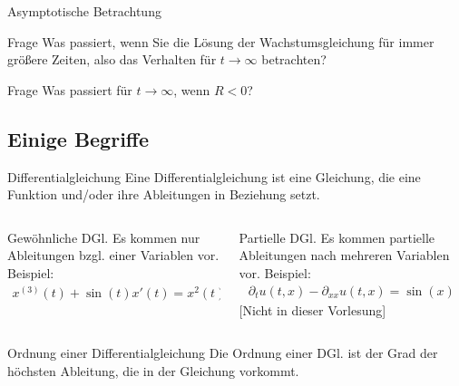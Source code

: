 \documentclass[notheorems,hidelinks,aspectratio=1610]{beamer}
\begin{document}
\begin{frame}{Asymptotische Betrachtung}
  \begin{exampleblock}{Frage}
    Was passiert, wenn Sie die Lösung der Wachstumsgleichung für immer
    größere Zeiten, also das Verhalten für $t\to\infty$ betrachten?
  \end{exampleblock}

  \begin{exampleblock}{Frage}
    Was passiert für $t\to\infty$, wenn $R<0$?
  \end{exampleblock}
\end{frame}
\subsection{Einige Begriffe}
\frame{\subtoc}
\begin{frame}
  \begin{block}{Differentialgleichung}
    Eine Differentialgleichung ist eine Gleichung, die eine Funktion
    und/oder ihre Ableitungen in Beziehung setzt.
  \end{block}
  \begin{columns}
    \begin{column}[t]{.5\textwidth}
      \begin{block}{Gewöhnliche DGl.}
        Es kommen nur Ableitungen bzgl. einer Variablen vor. Beispiel:
        \begin{gather*}
          x^{(3)}(t) + \sin(t) x'(t) = x^2(t) +t^2
        \end{gather*}
      \end{block}
    \end{column}
    \begin{column}[t]{.5\textwidth}
      \begin{block}{Partielle DGl.}
        Es kommen partielle Ableitungen nach mehreren Variablen vor.
        Beispiel:
        \begin{gather*}
          \partial_t u(t,x) - \partial_{xx} u(t,x) = \sin(x)
        \end{gather*}
      [Nicht in dieser Vorlesung]
      \end{block}
    \end{column}
  \end{columns}
  \pause
  \begin{block}{Ordnung einer Differentialgleichung}
    Die Ordnung einer DGl. ist der Grad der höchsten Ableitung, die in
    der Gleichung vorkommt.
  \end{block}
\end{frame}
\end{document}
